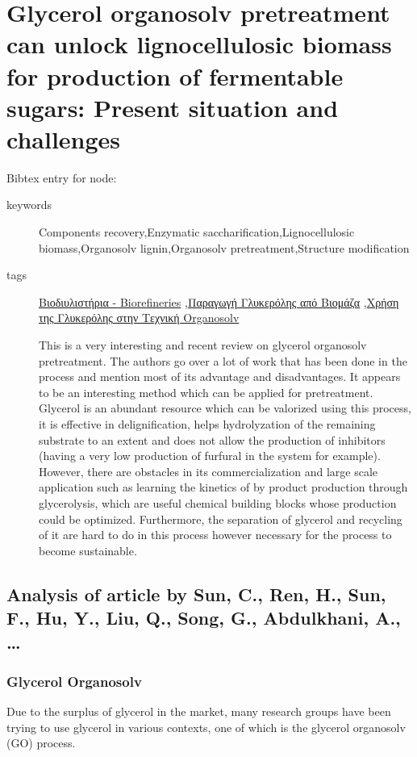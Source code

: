 \documentclass[11pt]{article}
\begin{document}
\section{Glycerol organosolv pretreatment can unlock lignocellulosic biomass for production of fermentable sugars: Present situation and challenges}
\label{sec:org23c6efa}
Bibtex entry for node: \cite{sunGlycerolOrganosolvPretreatment2022}

\begin{description}
\item[{keywords}] Components recovery,Enzymatic saccharification,Lignocellulosic biomass,Organosolv lignin,Organosolv pretreatment,Structure modification
\item[{tags}] \href{\detokenize{../../../../org_roam/βιοδιυλιστηρια-08-05-22.org}}{Βιοδιυλιστήρια - Biorefineries} ,\href{\detokenize{../../../../org_roam/παραγωγη_γλυκερολης_απο_βιομαζα-13-10-22.org}}{Παραγωγή Γλυκερόλης από Βιομάζα} ,\href{\detokenize{../../../../org_roam/χρηση_της_γλυκερολης_στην_τεχνικη_organosolv-09-11-22.org}}{Χρήση της Γλυκερόλης στην Τεχνική Organosolv} 

This is a very interesting and recent review on glycerol organosolv pretreatment. The authors go over a lot of work that has been done in the process and mention most of its advantage and disadvantages. It appears to be an interesting method which can be applied for pretreatment. Glycerol is an abundant resource which can be valorized using this process, it is effective in delignification, helps hydrolyzation of the remaining substrate to an extent and does not allow the production of inhibitors (having a very low production of furfural in the system for example). However, there are obstacles in its commercialization and large scale application such as learning the kinetics of by product production through glycerolysis, which are useful chemical building blocks whose production could be optimized. Furthermore, the separation of glycerol and recycling of it are hard to do in this process however necessary for the process to become sustainable.
\end{description}
\subsection{Analysis of article by Sun, C., Ren, H., Sun, F., Hu, Y., Liu, Q., Song, G., Abdulkhani, A., …}
\label{sec:orgc22c9e3}
\subsubsection{Glycerol Organosolv}
\label{sec:orgb0bbd72}
Due to the surplus of glycerol in the market, many research groups have been trying to use glycerol in various contexts, one of which is the glycerol organosolv (GO) process.
\end{document}
